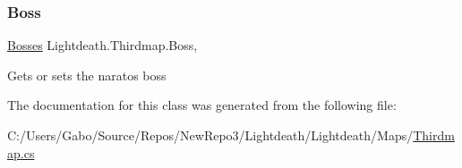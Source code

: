 \subsubsection{\texorpdfstring{Boss}{Boss}}
{\footnotesize\ttfamily \hyperlink{class_lightdeath_1_1_bosses}{Bosses} Lightdeath.\+Thirdmap.\+Boss\hspace{0.3cm}{\ttfamily [get]}, {\ttfamily [set]}}



Gets or sets the naratos boss 



The documentation for this class was generated from the following file\+:\begin{DoxyCompactItemize}
\item 
C\+:/\+Users/\+Gabo/\+Source/\+Repos/\+New\+Repo3/\+Lightdeath/\+Lightdeath/\+Maps/\hyperlink{_thirdmap_8cs}{Thirdmap.\+cs}\end{DoxyCompactItemize}

